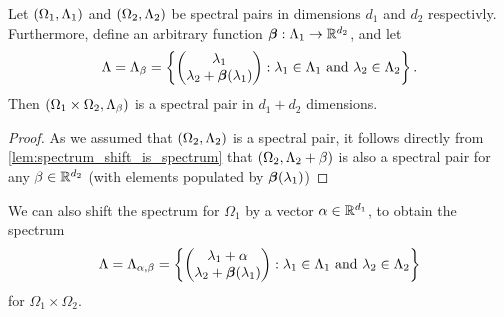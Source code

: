 \documentclass[../thesis.tex]{subfiles}
\begin{document}


\begin{lemma}\label{lem:beta_shift}
    Let $(\Omega_1,\Lambda_1)$ and $(\Omega_2,\Lambda_2)$ be spectral pairs in dimensions $d_1$ and $d_2$ respectivly. Furthermore, define an arbitrary function $\bm{\beta}: \Lambda_1 \rightarrow \mathbb{R}^{d_2}$, and let
    \begin{equation}
        \Lambda = \Lambda_\beta
        = \left\{\begin{pmatrix}
            \lambda_1 \\
            \lambda_2+\bm{\beta}(\lambda_1)
            \end{pmatrix}
        : \lambda_1 \in \Lambda_1 \text{ and } \lambda_2 \in \Lambda_2\right\}.
    \end{equation}
    Then $(\Omega_1 \times \Omega_2,\Lambda_\beta)$ is a spectral pair in $d_1+d_2$ dimensions. 
\end{lemma}
\begin{proof}
    As we assumed that $(\Omega_2,\Lambda_2)$ is a spectral pair, it follows directly from \cref{lem:spectrum_shift_is_spectrum} that $(\Omega_2,\Lambda_2+\beta)$ is also a spectral pair for any $\beta \in \mathbb{R}^{d_2}$ (with elements populated by $\bm{\beta}(\lambda_1)$)
\end{proof}
\begin{remark}
    We can also shift the spectrum for $\Omega_1$ by a vector $\alpha \in \mathbb{R}^{d_1}$, to obtain the spectrum 
    \begin{equation*}
        \Lambda = \Lambda_{\alpha,\beta} 
        = \left\{\begin{pmatrix}
            \lambda_1 +\alpha\\
            \lambda_2+\bm{\beta}(\lambda_1)
            \end{pmatrix}
        : \lambda_1 \in \Lambda_1 \text{ and } \lambda_2 \in \Lambda_2\right\}
    \end{equation*}
    for $\Omega_1 \times \Omega_2$.
\end{remark}
\end{document}
